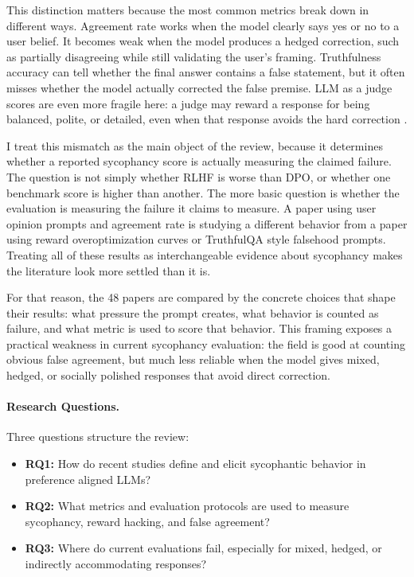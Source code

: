 \documentclass[letterpaper]{article} %
\begin{document}
This distinction matters because the most common metrics break down in different ways. Agreement rate works when the model clearly says yes or no to a user belief. It becomes weak when the model produces a hedged correction, such as partially disagreeing while still validating the user's framing. Truthfulness accuracy can tell whether the final answer contains a false statement, but it often misses whether the model actually corrected the false premise. LLM as a judge scores are even more fragile here: a judge may reward a response for being balanced, polite, or detailed, even when that response avoids the hard correction \cite{zheng2023judging}.

I treat this mismatch as the main object of the review, because it determines whether a reported sycophancy score is actually measuring the claimed failure. The question is not simply whether RLHF is worse than DPO, or whether one benchmark score is higher than another. The more basic question is whether the evaluation is measuring the failure it claims to measure. A paper using user opinion prompts and agreement rate is studying a different behavior from a paper using reward overoptimization curves or TruthfulQA style falsehood prompts. Treating all of these results as interchangeable evidence about sycophancy makes the literature look more settled than it is.

For that reason, the 48 papers are compared by the concrete choices that shape their results: what pressure the prompt creates, what behavior is counted as failure, and what metric is used to score that behavior. This framing exposes a practical weakness in current sycophancy evaluation: the field is good at counting obvious false agreement, but much less reliable when the model gives mixed, hedged, or socially polished responses that avoid direct correction.

\paragraph{Research Questions.}
Three questions structure the review:

\begin{itemize}
    \item \textbf{RQ1:} How do recent studies define and elicit sycophantic behavior in preference aligned LLMs?
    
    \item \textbf{RQ2:} What metrics and evaluation protocols are used to measure sycophancy, reward hacking, and false agreement?
    
    \item \textbf{RQ3:} Where do current evaluations fail, especially for mixed, hedged, or indirectly accommodating responses?
\end{itemize}
\end{document}
